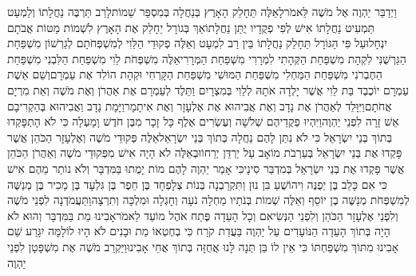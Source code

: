 \documentclass[../main/main.tex]{subfiles}
\begin{document}
\begin{multicols*}{\ncols}
וַיְדַבֵּר יַהְוֶה אֶל מֹשֶׁה לֵּאמֹר\PreVerseSpace{}לָאֵלֶּה תֵּחָלֵק הָאָרֶץ בְּנַחֲלָה בְּמִסְפַּר שֵׁמוֹת\PreVerseSpace{}לָרַב תַּרְבֶּה נַחֲלָתוֹ וְלַמְעַט תַּמְעִיט נַחֲלָתוֹ אִישׁ לְפִי פְקֻדָיו יֻתַּן נַחֲלָתוֹ\PreVerseSpace{}אַךְ בְּגוֹרָל יֵחָלֵק אֶת הָאָרֶץ לִשְׁמוֹת מַטּוֹת אֲבֹתָם יִנְחָלוּ\PreVerseSpace{}עַל פִּי הַגּוֹרָל תֵּחָלֵק נַחֲלָתוֹ בֵּין רַב לִמְעָט \ClosedSection{}וְאֵלֶּה פְקוּדֵי הַלֵּוִי לְמִשְׁפְּחֹתָם לְגֵרְשׁוֹן מִשְׁפַּחַת הַגֵּרְשֻׁנִּי לִקְהָת מִשְׁפַּחַת הַקְּהָתִי לִמְרָרִי מִשְׁפַּחַת הַמְּרָרִי\PreVerseSpace{}אֵלֶּה מִשְׁפְּחֹת לֵוִי מִשְׁפַּחַת הַלִּבְנִי מִשְׁפַּחַת הַחֶבְרֹנִי מִשְׁפַּחַת הַמַּחְלִי מִשְׁפַּחַת הַמּוּשִׁי מִשְׁפַּחַת הַקָּרְחִי וּקְהָת הוֹלִד אֶת עַמְרָם\PreVerseSpace{}וְשֵׁם אֵשֶׁת עַמְרָם יוֹכֶבֶד בַּת לֵוִי אֲשֶׁר יָלְדָה אֹתָהּ לְלֵוִי בְּמִצְרָיִם וַתֵּלֶד לְעַמְרָם אֶת אַהֲרֹן וְאֶת מֹשֶׁה וְאֵת מִרְיָם אֲחֹתָם\PreVerseSpace{}וַיִּוָּלֵד לְאַהֲרֹן אֶת נָדָב וְאֶת אֲבִיהוּא אֶת אֶלְעָזָר וְאֶת אִיתָמָר\PreVerseSpace{}וַיָּמָת נָדָב וַאֲבִיהוּא בְּהַקְרִיבָם אֵשׁ זָרָה לִפְנֵי יַהְוֶה\PreVerseSpace{}וַיִּהְיוּ פְקֻדֵיהֶם שְׁלֹשָׁה וְעֶשְׂרִים אֶלֶף כָּל זָכָר מִבֶּן חֹדֶשׁ וָמָעְלָה כִּי לֹא הָתְפָּקְדוּ בְּתוֹךְ בְּנֵי יִשְׂרָאֵל כִּי לֹא נִתַּן לָהֶם נַחֲלָה בְּתוֹךְ בְּנֵי יִשְׂרָאֵל\PreVerseSpace{}אֵלֶּה פְּקוּדֵי מֹשֶׁה וְאֶלְעָזָר הַכֹּהֵן אֲשֶׁר פָּקְדוּ אֶת בְּנֵי יִשְׂרָאֵל בְּעַרְבֹת מוֹאָב עַל יַרְדֵּן יְרֵחוֹ\PreVerseSpace{}וּבְאֵלֶּה לֹא הָיָה אִישׁ מִפְּקוּדֵי מֹשֶׁה וְאַהֲרֹן הַכֹּהֵן אֲשֶׁר פָּקְדוּ אֶת בְּנֵי יִשְׂרָאֵל בְּמִדְבַּר סִינָי\PreVerseSpace{}כִּי אָמַר יַהְוֶה לָהֶם מוֹת יָמֻתוּ בַּמִּדְבָּר וְלֹא נוֹתַר מֵהֶם אִישׁ כִּי אִם כָּלֵב בֶּן יְפֻנֶּה וִיהוֹשֻׁעַ בִּן נוּן \ClosedSection{}וַתִּקְרַבְנָה בְּנוֹת צְלָפְחָד בֶּן חֵפֶר בֶּן גִּלְעָד בֶּן מָכִיר בֶּן מְנַשֶּׁה לְמִשְׁפְּחֹת מְנַשֶּׁה בֶן יוֹסֵף וְאֵלֶּה שְׁמוֹת בְּנֹתָיו מַחְלָה נֹעָה וְחָגְלָה וּמִלְכָּה וְתִרְצָה\PreVerseSpace{}וַתַּעֲמֹדְנָה לִפְנֵי מֹשֶׁה וְלִפְנֵי אֶלְעָזָר הַכֹּהֵן וְלִפְנֵי הַנְּשִׂיאִם וְכָל הָעֵדָה פֶּתַח אֹהֶל מוֹעֵד לֵאמֹר\PreVerseSpace{}אָבִינוּ מֵת בַּמִּדְבָּר וְהוּא לֹא הָיָה בְּתוֹךְ הָעֵדָה הַנּוֹעָדִים עַל יַהְוֶה בַּעֲדַת קֹרַח כִּי בְחֶטְאוֹ מֵת וּבָנִים לֹא הָיוּ לוֹ\PreVerseSpace{}לָמָּה יִגָּרַע שֵׁם אָבִינוּ מִתּוֹךְ מִשְׁפַּחְתּוֹ כִּי אֵין לוֹ בֵּן תְּנָה לָּנוּ אֲחֻזָּה בְּתוֹךְ אֲחֵי אָבִינוּ\PreVerseSpace{}וַיַּקְרֵב מֹשֶׁה אֶת מִשְׁפָּטָן לִפְנֵי יַהְוֶה\OpenSection{}\par

\end{multicols*}
\end{document}
